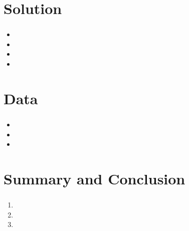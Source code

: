 \documentclass{beamer}
\begin{document}
 
    \section{Solution}
    \begin{frame}
      \frametitle{}
      \begin{itemize}
        \item 
        \item
        \item
        \item
        \end{itemize}
  \end{frame}
  
  \section{Data}
  \begin{frame}
    \frametitle{}
      \begin{itemize}
      \item 
      \item 
      \item 
    \end{itemize}
  \end{frame}

  \section{Summary and Conclusion}

   \begin{frame}
    \frametitle{}
    \begin{enumerate}
    \item 
    \item
    \item
    \end{enumerate}
  \end{frame}

  
\end{document}
